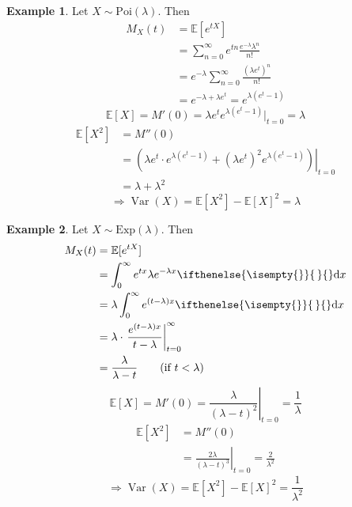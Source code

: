 \documentclass[a4paper,11pt]{amsbook}
\theoremstyle{definition}
\newtheorem{example}{\hspace{-2em} \color{darkblue} Example}[chapter]
\theoremstyle{remark}
\newcommand{\E}{\mathbb{E}}
\DeclareMathOperator\Var{Var}
\newcommand\0{\varnothing}
\newcommand\dx[1][]{\ifthenelse{\isempty{#1}}{\,}{}\mathrm{d}x}
\newcommand\Poi{\text{Poi}}
\newcommand\Exp{\text{Exp}}
\begin{document}
\begin{example}
    Let $X\sim\Poi(\lambda)$.
    Then \begin{align*}
        M_X(t)&=\E[e^{tX}] \\
        &=\sum_{n=0}^\infty e^{tn}\frac{e^{-\lambda}\lambda^n}{n!} \\
        &=e^{-\lambda}\sum_{n=0}^\infty\frac{(\lambda e^t)^n}{n!} \\
        &=e^{-\lambda+\lambda e^t}=e^{\lambda(e^t-1)}
    \end{align*}
    $$\E[X]=M'(0)=\lambda e^te^{\lambda(e^t-1)}\big|_{t=0}=\lambda$$
    \begin{align*}
        \E[X^2]&=M''(0) \\
        &=\left.\left(\lambda e^t\cdot e^{\lambda(e^t-1)}+(\lambda e^{t})^2e^{\lambda(e^t-1)}\right)\right|_{t=0} \\
        &=\lambda+\lambda^2
    \end{align*}
    $$\Rightarrow\Var(X)=\E[X^2]-\E[X]^2=\lambda$$
\end{example}

\begin{example}
    Let $X\sim\Exp(\lambda)$.
    Then \begin{align*}
        M_X(t)&=\E[e^{tX}] \\
        &=\int_0^\infty e^{tx}\lambda e^{-\lambda x}\dx \\
        &=\lambda\int_0^\infty e^{(t-\lambda)x}\dx \\
        &=\lambda\cdot\left.\frac{e^{(t-\lambda)x}}{t-\lambda}\right|_{t=0}^\infty \\
        &=\frac{\lambda}{\lambda-t} \tag{if $t<\lambda$}
    \end{align*}
    $$\E[X]=M'(0)=\left.\frac{\lambda}{(\lambda-t)^2}\right|_{t=0}=\frac{1}{\lambda}$$
    \begin{align*}
        \E[X^2]&=M''(0) \\
        &=\left.\frac{2\lambda}{(\lambda-t)^3}\right|_{t=0}=\frac{2}{\lambda^2}
    \end{align*}
    $$\Rightarrow\Var(X)=\E[X^2]-\E[X]^2=\frac{1}{\lambda^2}$$
\end{example}
\end{document}
